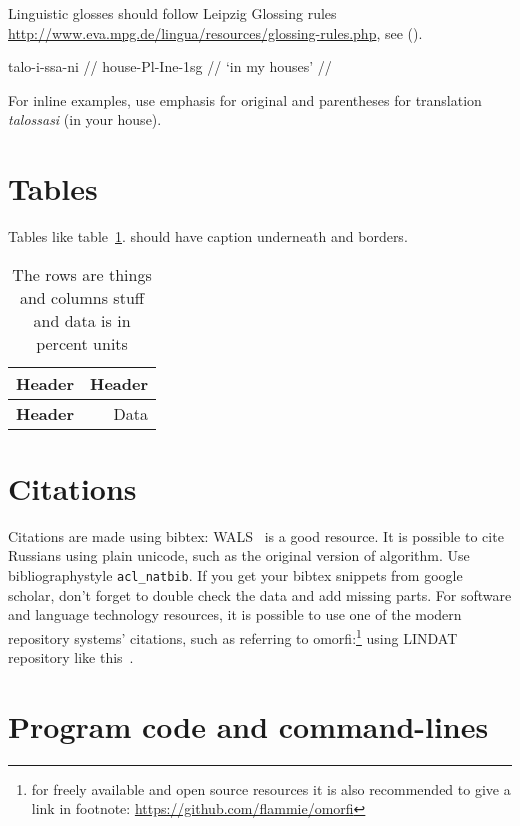 \documentclass[a4paper,notitlepage]{article}
\begin{document}
Linguistic glosses should follow Leipzig Glossing rules
\url{http://www.eva.mpg.de/lingua/resources/glossing-rules.php}, see (\nextx).

\ex
\begingl
\gla talo-i-ssa-ni //
\glb house-{\sc Pl}-{\sc Ine}-{\sc 1sg} //
\glft `in my houses' //
\endgl
\xe

For inline examples, use emphasis for original and parentheses for translation
\emph{talossasi} (in your house).


\section{Tables}

Tables like table~\ref{table:example}. should have caption underneath and
borders.

\begin{table}
    \center
    \begin{tabular}{|l|r|}
        \hline
        \bf Header & \bf Header \\
        \hline
        \bf Header & Data \\
        \hline
    \end{tabular}
    \caption{The rows are things and columns stuff and data is in percent units
    \label{table:example}}
\end{table}

\section{Citations}

Citations are made using bibtex: WALS~\citep{haspelmath2005world} is a good
resource.  It is possible to cite Russians using plain unicode, such as the
original version of \citet{levenshtein1965} algorithm.  Use bibliographystyle
\texttt{acl\_natbib}. If you get your bibtex snippets from google scholar, don't
forget to double check the data and add missing parts.  For software and
language technology resources, it is possible to use one of the modern
repository systems' citations, such as referring to omorfi:\footnote{for freely
available and open source resources it is also recommended to give a link in
footnote: \url{https://github.com/flammie/omorfi}} using LINDAT repository like
this~\citep{omorfi}.

\section{Program code and command-lines}
\end{document}
